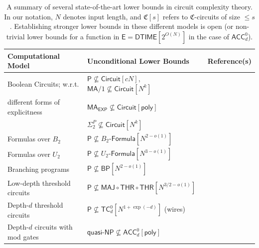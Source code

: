 \documentclass{toc}
\begin{document}
\begin{table}[h!]
  \renewcommand{\arraystretch}{1.3}
\begin{center}
  \begin{tabular}{| l | l | c |}
    \hline
    \textbf{Computational Model} & \textbf{Unconditional Lower Bounds} & \textbf{Reference(s)} \\ \hline  \vspace{-0.15cm}
    Boolean Circuits; w.r.t. & $\mathsf{P} \nsubseteq \mathsf{Circuit}[c  N]$, $\mathsf{MA}/1 \nsubseteq \mathsf{Circuit}[N^k]$ & \cite{DBLP:conf/mfcs/IwamaM02, DBLP:conf/focs/FindGHK16} \\ 
    different forms of explicitness & $\mathsf{MA}_\mathsf{EXP} \nsubseteq \mathsf{Circuit}[\mathsf{poly}]$ & \cite{DBLP:conf/coco/BuhrmanFT98, DBLP:journals/siamcomp/Santhanam09}\\ %
& $\Sigma^P_2\not\subseteq \mathsf{Circuit}[N^k]$ & \cite{DBLP:journals/iandc/Kannan82} \\ \hline 
    Formulas over $B_2$  & $\mathsf{P} \nsubseteq B_2$-$\mathsf{Formula}[N^{2 - o(1)}]$ & \cite{ne66}  \\  \hline
    Formulas over $U_2$  & $\mathsf{P} \nsubseteq U_2$-$\mathsf{Formula}[N^{3 - o(1)}]$ & \cite{DBLP:journals/siamcomp/Hastad98, DBLP:conf/focs/Tal14, DBLP:conf/coco/DinurM16} \\  \hline
    Branching programs & $\mathsf{P} \nsubseteq  \mathsf{BP}[N^{2 - o(1)}]$ & \cite{ne66} \\  \hline
    Low-depth threshold circuits & $\mathsf{P} \nsubseteq \mathsf{MAJ} \circ \mathsf{THR} \circ \mathsf{THR}[N^{3/2 - o(1)}]$ & \cite{DBLP:conf/stoc/KaneW16} \\  \hline
    Depth-$d$ threshold circuits & $\mathsf{P} \nsubseteq \mathsf{TC}^0_d[N^{1 + \exp(-d)}]$ (wires) & \cite{DBLP:journals/siamcomp/ImpagliazzoPS97} \\  \hline
    Depth-$d$ circuits with mod gates & $\mathsf{quasi}$-$\mathsf{NP} \nsubseteq \mathsf{ACC}^0_d[\mathsf{poly}]$ & \cite{DBLP:conf/stoc/MurrayW18} \\  \hline
  \end{tabular}
  \vspace{0.3cm}
  \caption{A summary of several state-of-the-art lower bounds in circuit complexity theory. In our notation, $N$ denotes input length, and $\mathfrak{C}[s]$ refers to $\mathfrak{C}$-circuits of size $\leq s$. Establishing stronger lower bounds in these different models is open (or non-trivial lower bounds for a function in $\mathsf{E} = \mathsf{DTIME}[2^{O(N)}]$ in the case of $\mathsf{ACC}^0_d$).}
\label{table:state-of-the-art}
\end{center}
\end{table}
\end{document}
